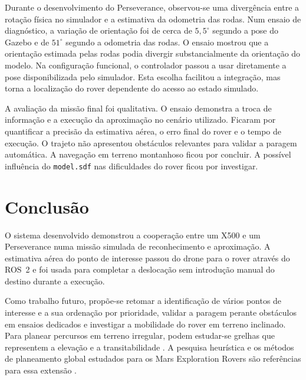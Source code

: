 \documentclass[conference]{IEEEtran}
\begin{document}
Durante o desenvolvimento do Perseverance, observou-se uma divergência entre a rotação física no simulador e a estimativa da odometria das rodas. Num ensaio de diagnóstico, a variação de orientação foi de cerca de $5{,}5^\circ$ segundo a pose do Gazebo e de $51^\circ$ segundo a odometria das rodas. O ensaio mostrou que a orientação estimada pelas rodas podia divergir substancialmente da orientação do modelo. Na configuração funcional, o controlador passou a usar diretamente a pose disponibilizada pelo simulador. Esta escolha facilitou a integração, mas torna a localização do rover dependente do acesso ao estado simulado.

A avaliação da missão final foi qualitativa. O ensaio demonstra a troca de informação e a execução da aproximação no cenário utilizado. Ficaram por quantificar a precisão da estimativa aérea, o erro final do rover e o tempo de execução. O trajeto não apresentou obstáculos relevantes para validar a paragem automática. A navegação em terreno montanhoso ficou por concluir. A possível influência do \texttt{model.sdf} nas dificuldades do rover ficou por investigar.

\section{Conclusão}

O sistema desenvolvido demonstrou a cooperação entre um X500 e um Perseverance numa missão simulada de reconhecimento e aproximação. A estimativa aérea do ponto de interesse passou do drone para o rover através do ROS~2 e foi usada para completar a deslocação sem introdução manual do destino durante a execução.

Como trabalho futuro, propõe-se retomar a identificação de vários pontos de interesse e a sua ordenação por prioridade, validar a paragem perante obstáculos em ensaios dedicados e investigar a mobilidade do rover em terreno inclinado. Para planear percursos em terreno irregular, podem estudar-se grelhas que representem a elevação e a transitabilidade \cite{grid-map}. A pesquisa heurística e os métodos de planeamento global estudados para os Mars Exploration Rovers são referências para essa extensão \cite{hart1968,carsten2007}.



\end{document}
